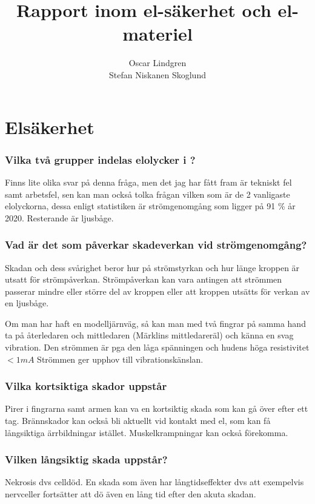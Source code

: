 \documentclass[a4paper,swedish]{article}
\title{Rapport inom el-säkerhet och el-materiel}
\author{Oscar Lindgren\\Stefan Niskanen Skoglund}
\begin{document}
\part{Elsäkerhet}

\section{Vilka två grupper indelas elolycker i ?}\label{sec:q_1}

Finns lite olika svar på denna fråga, men det jag har fått fram är tekniskt fel samt arbetsfel, sen kan man också tolka frågan
vilken som är de 2 vanligaste elolyckorna, dessa enligt statistiken är strömgenomgång som ligger på 91 \%
år 2020. Resterande är ljusbåge.

\section{Vad är det som påverkar skadeverkan vid strömgenomgång?} \label{sec:strömgenomgång}

Skadan och dess svårighet beror hur på strömstyrkan och hur länge kroppen är utsatt för strömpåverkan.
Strömpåverkan kan vara antingen att strömmen passerar mindre eller större del av kroppen eller att kroppen
utsätts för verkan av en ljusbåge.

Om man har haft en modelljärnväg, så kan man med två fingrar på samma hand ta på återledaren och mittledaren (Märklins mittledareräl) och känna en svag
vibration. Den strömmen är pga den låga spänningen och hudens höga resistivitet $< 1 mA$
Strömmen ger upphov till vibrationskänslan.

\section{Vilka kortsiktiga skador uppstår}
\label{sec:q_3}

Pirer i fingrarna samt armen kan va en kortsiktig skada som kan gå över efter ett tag. Brännskador kan också bli aktuellt
vid kontakt med el, som kan få långsiktiga ärrbildningar istället. Muskelkrampningar kan också förekomma.

\section{Vilken långsiktig skada uppstår?}\label{sec:permanent_skada}

Nekrosis dvs celldöd. En skada som även har långtidseffekter dvs att exempelvis nervceller
fortsätter att dö även en lång tid efter den akuta skadan.
\end{document}
